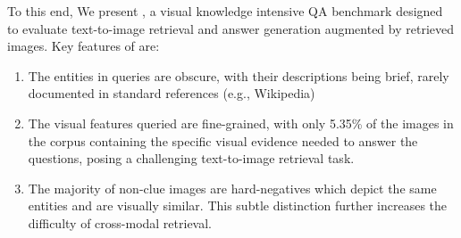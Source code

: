To this end, We present \dsns, a visual knowledge intensive QA benchmark designed to evaluate text-to-image retrieval and answer generation augmented by retrieved images. Key features of \ds are:
\vspace{-0.5em}
\begin{enumerate}
    \item The entities in queries are obscure, with their descriptions being brief, rarely documented in standard references (e.g., Wikipedia)
    \vspace{-0.5em}
    \item The visual features queried are fine-grained, with only 5.35\% of the images in the corpus containing the specific visual evidence needed to answer the questions, posing a challenging text-to-image retrieval task.
    \item The majority of non-clue images are hard-negatives which depict the same entities and are visually similar. This subtle distinction further increases the difficulty of cross-modal retrieval.
\end{enumerate}

\vspace{-0.5em}


